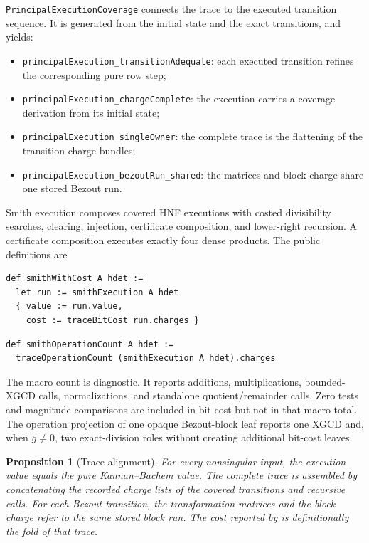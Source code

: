 \documentclass[11pt]{article}
\newtheorem{proposition}[theorem]{Proposition}
\theoremstyle{definition}
\newcommand{\code}[1]{\texttt{\detokenize{#1}}}
\newcommand{\decl}[1]{\nolinkurl{#1}}
\begin{document}
\decl{PrincipalExecutionCoverage} connects the trace to the executed transition sequence.  It is generated from the initial state and the exact transitions, and yields:

\begin{itemize}
  \item \decl{principalExecution_transitionAdequate}: each executed transition refines the corresponding pure row step;
  \item \decl{principalExecution_chargeComplete}: the execution carries a coverage derivation from its initial state;
  \item \decl{principalExecution_singleOwner}: the complete trace is the flattening of the transition charge bundles;
  \item \decl{principalExecution_bezoutRun_shared}: the matrices and block charge share one stored Bezout run.
\end{itemize}

Smith execution composes covered HNF executions with costed divisibility searches, clearing, injection, certificate composition, and lower-right recursion.  A certificate composition executes exactly four dense products.  The public definitions are

\begin{lstlisting}[basicstyle=\ttfamily\footnotesize]
def smithWithCost A hdet :=
  let run := smithExecution A hdet
  { value := run.value,
    cost := traceBitCost run.charges }
\end{lstlisting}
\noindent\begin{minipage}{\linewidth}
\begin{lstlisting}[basicstyle=\ttfamily\footnotesize]
def smithOperationCount A hdet :=
  traceOperationCount (smithExecution A hdet).charges
\end{lstlisting}
\end{minipage}

The macro count is diagnostic.  It reports additions, multiplications, bounded-XGCD calls, normalizations, and standalone quotient/remainder calls.  Zero tests and magnitude comparisons are included in bit cost but not in that macro total.  The operation projection of one opaque Bezout-block leaf reports one XGCD and, when $g\ne0$, two exact-division roles without creating additional bit-cost leaves.

\begin{proposition}[Trace alignment]
For every nonsingular input, the execution value equals the pure Kannan--Bachem value.  The complete trace is assembled by concatenating the recorded charge lists of the covered transitions and recursive calls.  For each Bezout transition, the transformation matrices and the block charge refer to the same stored block run.  The cost reported by \code{smithWithCost} is definitionally the fold of that trace.
\end{proposition}
\end{document}
